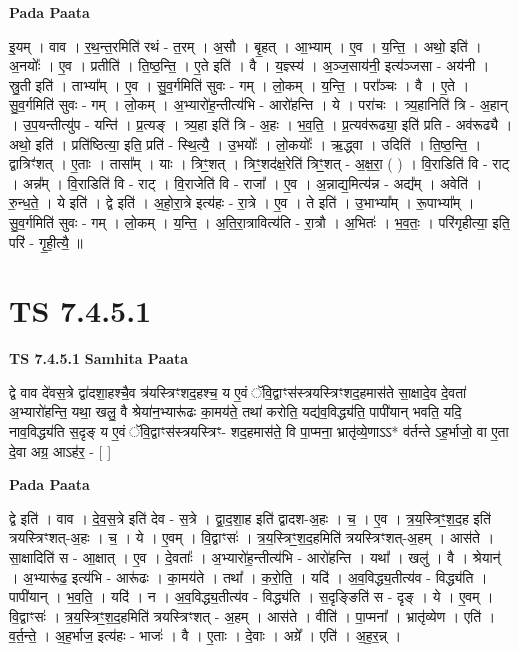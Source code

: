 \documentclass[17pt]{extarticle}
\begin{document}
\textbf{Pada Paata} \newline

इ॒यम् । वाव । र॒थ॒न्त॒रमिति॑ रथं - त॒रम् । अ॒सौ । बृ॒हत् । आ॒भ्याम् । ए॒व । य॒न्ति॒ । अथो॒ इति॑ । अ॒नयोः᳚ । ए॒व । प्रतीति॑ । ति॒ष्ठ॒न्ति॒ । ए॒ते इति॑ । वै । य॒ज्ञ्स्य॑ । अ॒ञ्ज॒साय॑नी॒ इत्य॑ञ्जसा - अय॑नी । स्रु॒ती इति॑ । ताभ्या᳚म् । ए॒व । सु॒व॒र्गमिति॑ सुवः - गम् । लो॒कम् । य॒न्ति॒ । परा᳚ञ्चः । वै । ए॒ते । सु॒व॒र्गमिति॑ सुवः - गम् । लो॒कम् । अ॒भ्यारो॑ह॒न्तीत्य॑भि - आरो॑हन्ति । ये । परा॑चः । त्र्य॒हानिति॑ त्रि - अ॒हान् । उ॒प॒यन्तीत्यु॑प - यन्ति॑ । प्र॒त्यङ् । त्र्य॒हा इति॑ त्रि - अ॒हः । भ॒व॒ति॒ । प्र॒त्यव॑रूढ्या॒ इति॑ प्रति - अव॑रूढ्यै । अथो॒ इति॑ । प्रति॑ष्ठित्या॒ इति॒ प्रति॑ - स्थि॒त्यै॒ । उ॒भयोः᳚ । लो॒कयोः᳚ । ऋ॒द्ध्वा । उदिति॑ । ति॒ष्ठ॒न्ति॒ । द्वात्रिꣳ॑शत् । ए॒ताः । तासा᳚म् । याः । त्रिꣳ॒॒शत् । त्रिꣳ॒॒शद॑क्ष॒रेति॑ त्रिꣳ॒॒शत् - अ॒क्ष॒रा॒ ( ) । वि॒राडिति॑ वि - राट् । अन्न᳚म् । वि॒राडिति॑ वि - राट् । वि॒राजेति॑ वि - राजा᳚ । ए॒व । अ॒न्नाद्य॒मित्य॑न्न - अद्य᳚म् । अवेति॑ । रु॒न्ध॒ते॒ । ये इति॑ । द्वे इति॑ । अ॒हो॒रा॒त्रे इत्य॑हः - रा॒त्रे । ए॒व । ते इति॑ । उ॒भाभ्या᳚म् । रू॒पाभ्या᳚म् । सु॒व॒र्गमिति॑ सुवः - गम् । लो॒कम् । य॒न्ति॒ । अ॒ति॒रा॒त्रावित्य॑ति - रा॒त्रौ । अ॒भितः॑ । भ॒व॒तः॒ । परि॑गृहीत्या॒ इति॒ परि॑ - गृ॒ही॒त्यै॒ ॥  \newline




\section*{ TS 7.4.5.1 }

\textbf{TS 7.4.5.1 } \newline
\textbf{Samhita Paata} \newline

द्वे वाव दे॑वस॒त्रे द्वा॑दशा॒हश्चै॒व त्र॑यस्त्रिꣳशद॒हश्च॒ य ए॒वं ॅवि॒द्वाꣳस॑स्त्रयस्त्रिꣳशद॒हमास॑ते सा॒क्षादे॒व दे॒वता॑ अ॒भ्यारो॑हन्ति॒ यथा॒ खलु॒ वै श्रेया॑न॒भ्यारू॑ढः का॒मय॑ते॒ तथा॑ करोति॒ यद्य॑व॒विद्ध्य॑ति॒ पापी॑यान् भवति॒ यदि॒ नाव॒विद्ध्य॑ति स॒दृङ् य ए॒वं ॅवि॒द्वाꣳस॑स्त्रयस्त्रिꣳ- शद॒हमास॑ते॒ वि पा॒प्मना॒ भ्रातृ॑व्ये॒णाऽऽ* व॑र्तन्ते ऽह॒र्भाजो॒ वा ए॒ता दे॒वा अग्र॒ आऽह॑र॒ - [  ] \newline

\textbf{Pada Paata} \newline

द्वे इति॑ । वाव । दे॒व॒स॒त्रे इति॑ देव - स॒त्रे । द्वा॒द॒शा॒ह इति॑ द्वादश-अ॒हः । च॒ । ए॒व । त्र॒य॒स्त्रिꣳ॒॒श॒द॒ह इति॑ त्रयस्त्रिꣳशत्-अ॒हः । च॒ । ये । ए॒वम् । वि॒द्वाꣳसः॑ । त्र॒य॒स्त्रिꣳ॒॒श॒द॒हमिति॑ त्रयस्त्रिꣳशत्-अ॒हम् । आस॑ते । सा॒क्षादिति॑ स - आ॒क्षात् । ए॒व । दे॒वताः᳚ । अ॒भ्यारो॑ह॒न्तीत्य॑भि - आरो॑हन्ति । यथा᳚ । खलु॑ । वै । श्रेयान्॑ । अ॒भ्यारू॑ढ॒ इत्य॑भि - आरू॑ढः । का॒मय॑ते । तथा᳚ । क॒रो॒ति॒ । यदि॑ । अ॒व॒विद्ध्य॒तीत्य॑व - विद्ध्य॑ति । पापी॑यान् । भ॒व॒ति॒ । यदि॑ । न । अ॒व॒विद्ध्य॒तीत्य॑व - विद्ध्य॑ति । स॒दृङ्ङिति॑ स - दृङ् । ये । ए॒वम् । वि॒द्वाꣳसः॑ । त्र॒य॒स्त्रिꣳ॒॒श॒द॒हमिति॑ त्रयस्त्रिꣳशत् - अ॒हम् । आस॑ते । वीति॑ । पा॒प्मना᳚ । भ्रातृ॑व्येण । एति॑ । व॒र्त॒न्ते॒ । अ॒ह॒र्भाज॒ इत्य॑हः - भाजः॑ । वै । ए॒ताः । दे॒वाः । अग्रे᳚ । एति॑ । अ॒ह॒र॒न्न् ।  \newline
\end{document}
